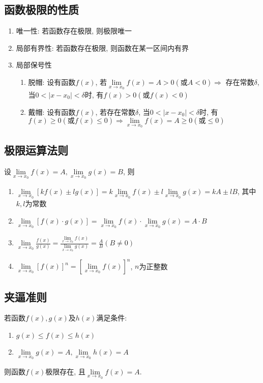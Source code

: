\subsection{函数极限的性质}
\begin{enumerate}
\item 唯一性: 若函数存在极限, 则极限唯一
\item 局部有界性: 若函数存在极限, 则函数在某一区间内有界
\item 局部保号性
\begin{enumerate}
\item 脱帽: 设有函数$ f(x) $, 若$ \lim\limits_{x\rightarrow x_{0}}f(x)=A>0(\text{或}A<0) \Rightarrow $ 存在常数$ \delta $, 当$ 0<|x-x_{0}|<\delta $时, 有$ f(x)>0(\text{或}f(x)<0) $
\item 戴帽: 设有函数$ f(x) $, 若存在常数$ \delta $, 当$ 0<|x-x_{0}|<\delta $时, 有$ f(x)\ge 0(\text{或}f(x)\le 0) \Rightarrow \lim\limits_{x\rightarrow x_{0}}f(x)=A\ge 0(\text{或}\le 0) $
\end{enumerate}
\end{enumerate}
\subsection{极限运算法则}
设$ \lim\limits_{x\rightarrow x_{0}}f(x)=A, \lim\limits_{x\rightarrow x_{0}}g(x)=B $, 则
\begin{enumerate}
\item $ \lim\limits_{x\rightarrow x_{0}}[kf(x)\pm lg(x)]=k \lim\limits_{x\rightarrow x_{0}}f(x)\pm l \lim\limits_{x\rightarrow x_{0}}g(x)=kA\pm lB $, 其中$ k,l $为常数
\item $ \lim\limits_{x\rightarrow x_{0}}[f(x)\cdot g(x)]=\lim\limits_{x\rightarrow x_{0}}f(x)\cdot \lim\limits_{x\rightarrow x_{0}}g(x)=A\cdot B $
\item $ \lim\limits_{x\rightarrow x_{0}}\frac{f(x)}{g(x)}=\frac{\lim\limits_{x\rightarrow x_{0}}f(x)}{\lim\limits_{x\rightarrow x_{0}}g(x)}=\frac{A}{B}(B\neq 0) $
\item $ \lim\limits_{x\rightarrow x_{0}}[f(x)]^{n}=[\lim\limits_{x\rightarrow x_{0}}f(x)]^{n} $, $ n $为正整数
\end{enumerate}
\subsection{夹逼准则}
若函数$ f(x), g(x) $及$ h(x) $满足条件:
\begin{enumerate}
\item $ g(x)\le f(x)\le h(x) $
\item $ \lim\limits_{x\rightarrow x_{0}}g(x)=A, \lim\limits_{x\rightarrow x_{0}}h(x)=A $
\end{enumerate}\par
则函数$ f(x) $极限存在, 且$ \lim\limits_{x\rightarrow x_{0}}f(x)=A $.
